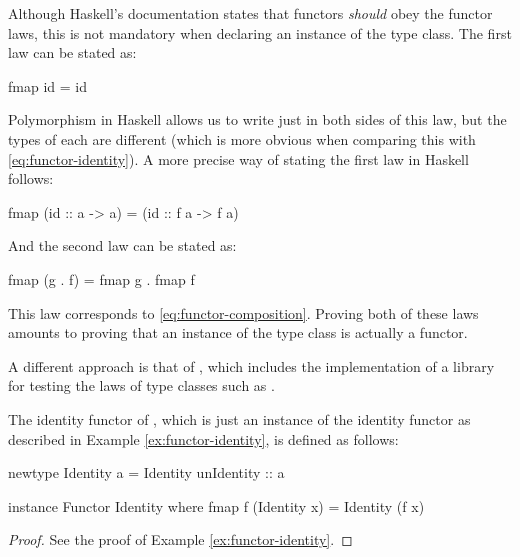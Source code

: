 Although Haskell's documentation states that functors \emph{should}
obey the functor laws, this is not mandatory when declaring an
instance of the  type class. The first law can be
stated as:
\begin{codehaskell}
fmap id = id
\end{codehaskell}
Polymorphism in Haskell allows us to write just  in
both sides of this law, but the types of each  are
different (which is more obvious when comparing this with
\eqref{eq:functor-identity}). A more precise way of stating the first
law in Haskell follows:
\begin{codehaskell}
fmap (id :: a -> a) = (id :: f a -> f a)
\end{codehaskell}
And the second law can be stated as:
\begin{codehaskell}
fmap (g . f) = fmap g . fmap f
\end{codehaskell}
This law corresponds to \eqref{eq:functor-composition}. Proving both
of these laws amounts to proving that an instance of the
 type class is actually a functor.

\begin{remark}

  A different approach is that of \parencite{jeuring-2012}, which
  includes the implementation of a library for testing the laws of
  type classes such as .

\end{remark}

\begin{example}
  \label{ex:functor-identity-haskell}

  The identity functor of \hask, which is just an instance of the
  identity functor as described in Example \ref{ex:functor-identity},
  is defined as follows:
  \begin{codehaskell}
newtype Identity a = Identity {unIdentity :: a}

instance Functor Identity where
  fmap f (Identity x) = Identity (f x)
  \end{codehaskell}


  \begin{proof}

    See the proof of Example \ref{ex:functor-identity}.

  \end{proof}

\end{example}

